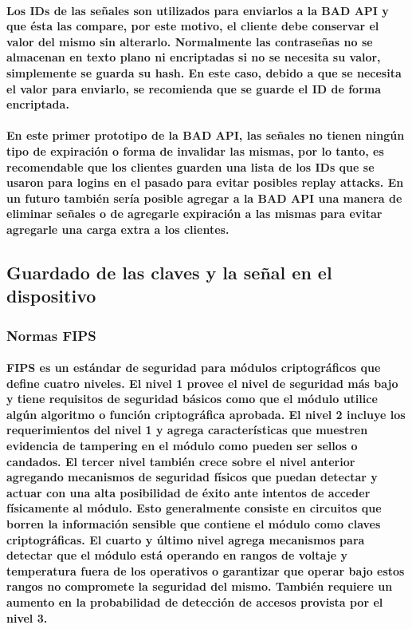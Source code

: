 \documentclass{article}
\begin{document}
\paragraph{
Los IDs de las señales son utilizados para enviarlos a la BAD API y que ésta las compare, por este motivo, el cliente debe conservar el valor del mismo sin alterarlo. Normalmente las contraseñas no se almacenan en texto plano ni encriptadas si no se necesita su valor, simplemente se guarda su hash. En este caso, debido a que se necesita el valor para enviarlo, se recomienda que se guarde el ID de forma encriptada.
}
\paragraph{
En este primer prototipo de la BAD API, las señales no tienen ningún tipo de expiración o forma de invalidar las mismas, por lo tanto, es recomendable que los clientes guarden una lista de los IDs que se usaron para logins en el pasado para evitar posibles replay attacks. En un futuro también sería posible agregar a la BAD API una manera de eliminar señales o de agregarle expiración a las mismas para evitar agregarle una carga extra a los clientes.
}
\subsection{Guardado de las claves y la señal en el dispositivo}
\subsubsection{Normas FIPS}
\paragraph{
FIPS es un estándar de seguridad para módulos criptográficos que define cuatro niveles. El nivel 1 provee el nivel de seguridad más bajo y tiene requisitos de seguridad básicos como que el módulo utilice algún algoritmo o función criptográfica aprobada. El nivel 2 incluye los requerimientos del nivel 1 y agrega características que muestren evidencia de tampering en el módulo como pueden ser sellos o candados. El tercer nivel también crece sobre el nivel anterior agregando mecanismos de seguridad físicos que puedan detectar y actuar con una alta posibilidad de éxito ante intentos de acceder físicamente al módulo. Esto generalmente consiste en circuitos que borren la información sensible que contiene el módulo como claves criptográficas. El cuarto y último nivel agrega mecanismos para detectar que el módulo está operando en rangos de voltaje y temperatura fuera de los operativos o garantizar que operar bajo estos rangos no compromete la seguridad del mismo. También requiere un aumento en la probabilidad de detección de accesos provista por el nivel 3.
}
\end{document}
